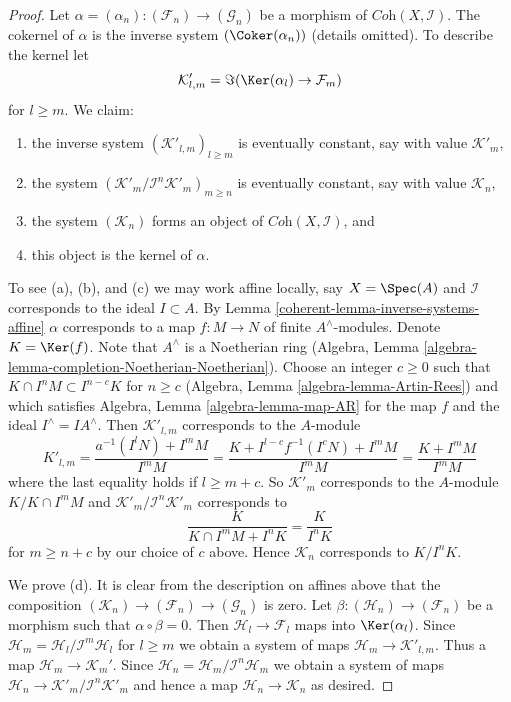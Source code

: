 \begin{proof}

Let $\alpha =(\alpha_n) : (\mathcal{F}_n) \to (\mathcal{G}_n)$ be a morphism of
$\textit{Coh}(X, \mathcal{I})$. The cokernel of $\alpha$ is the inverse system
$(\Coker(\alpha_n))$ (details omitted). To describe the kernel let
$$
\mathcal{K}'_{l, m} = \Im(\Ker(\alpha_l) \to \mathcal{F}_m)
$$
for $l \geq m$.
We claim:
\begin{enumerate}
\item[(a)] the inverse system $(\mathcal{K}'_{l, m})_{l \geq m}$ is
eventually constant, say with value $\mathcal{K}'_m$,
\item[(b)] the system $(\mathcal{K}'_m/\mathcal{I}^n\mathcal{K}'_m)_{m \geq n}$
is eventually constant, say with value $\mathcal{K}_n$,
\item[(c)] the system $(\mathcal{K}_n)$ forms an object of
$\textit{Coh}(X, \mathcal{I})$, and
\item[(d)] this object is the kernel of $\alpha$.
\end{enumerate}
To see (a), (b), and (c) we may work affine locally, say $X = \Spec(A)$
and $\mathcal{I}$ corresponds to the ideal $I \subset A$. By
Lemma \ref{coherent-lemma-inverse-systems-affine}
$\alpha$ corresponds to a map $f : M \to N$ of finite $A^\wedge$-modules.
Denote $K = \Ker(f)$. Note that $A^\wedge$ is a Noetherian
ring (Algebra, Lemma \ref{algebra-lemma-completion-Noetherian-Noetherian}).
Choose an integer $c \geq 0$ such that
$K \cap I^n M \subset I^{n - c}K$ for $n \geq c$
(Algebra, Lemma \ref{algebra-lemma-Artin-Rees})
and which satisfies Algebra, Lemma \ref{algebra-lemma-map-AR}
for the map $f$ and the ideal $I^\wedge = IA^\wedge$. Then
$\mathcal{K}'_{l, m}$ corresponds to the $A$-module
$$
K'_{l, m} = \frac{a^{-1}(I^lN) + I^mM}{I^mM} =
\frac{K + I^{l - c}f^{-1}(I^cN) + I^mM}{I^mM} =
\frac{K + I^mM}{I^mM}
$$
where the last equality holds if $l \geq m + c$. So $\mathcal{K}'_m$
corresponds to the $A$-module $K/K \cap I^mM$ and
$\mathcal{K}'_m/\mathcal{I}^n\mathcal{K}'_m$ corresponds to
$$
\frac{K}{K \cap I^mM + I^nK} = \frac{K}{I^nK}
$$
for $m \geq n + c$ by our choice of $c$ above. Hence $\mathcal{K}_n$
corresponds to $K/I^nK$.

\medskip\noindent
We prove (d). It is clear from the description on affines above that
the composition $(\mathcal{K}_n) \to (\mathcal{F}_n) \to (\mathcal{G}_n)$
is zero. Let $\beta : (\mathcal{H}_n) \to (\mathcal{F}_n)$
be a morphism such that $\alpha \circ \beta = 0$. Then
$\mathcal{H}_l \to \mathcal{F}_l$ maps into $\Ker(\alpha_l)$.
Since $\mathcal{H}_m = \mathcal{H}_l/\mathcal{I}^m\mathcal{H}_l$
for $l \geq m$ we obtain a system of maps
$\mathcal{H}_m \to \mathcal{K}'_{l, m}$. Thus a map
$\mathcal{H}_m \to \mathcal{K}_m'$. Since
$\mathcal{H}_n = \mathcal{H}_m/\mathcal{I}^n\mathcal{H}_m$ we obtain
a system of maps $\mathcal{H}_n \to \mathcal{K}'_m/\mathcal{I}^n\mathcal{K}'_m$
and hence a map $\mathcal{H}_n \to \mathcal{K}_n$ as desired.


\end{proof}
